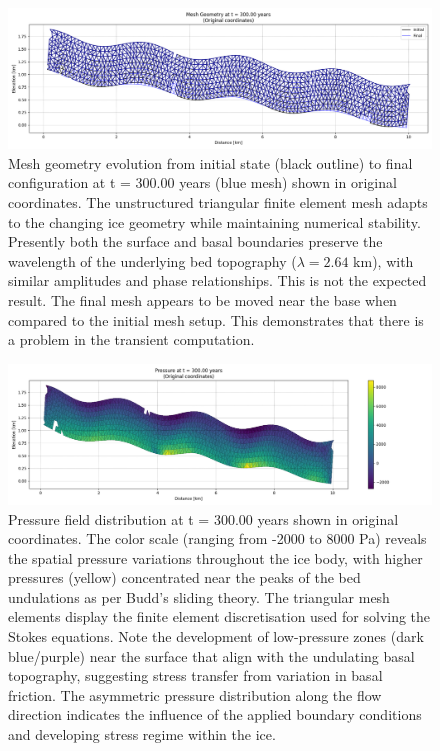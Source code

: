 \begin{figure}
    \includegraphics[scale=0.45]{overlap_xz.png}
    \caption{Mesh geometry evolution from initial state (black outline) to final configuration at t = 300.00 years (blue mesh) shown in original coordinates. The unstructured triangular finite element mesh adapts to the changing ice geometry while maintaining numerical stability. Presently both the surface and basal boundaries preserve the wavelength of the underlying bed topography ($\lambda = 2.64$ km), with similar amplitudes and phase relationships. This is not the expected result. The final mesh appears to be moved near the base when compared to the initial mesh setup. This demonstrates that there is a problem in the transient computation.}
    \label{fig:}
\end{figure}

\begin{figure}
    \includegraphics[scale=0.45]{Pressure_300yrs_xz.png}
    \caption{Pressure field distribution at t = 300.00 years shown in original coordinates. The color scale (ranging from -2000 to 8000 Pa) reveals the spatial pressure variations throughout the ice body, with higher pressures (yellow) concentrated near the peaks of the bed undulations as per Budd's sliding theory. The triangular mesh elements display the finite element discretisation used for solving the Stokes equations. Note the development of low-pressure zones (dark blue/purple) near the surface that align with the undulating basal topography, suggesting stress transfer from variation in basal friction. The asymmetric pressure distribution along the flow direction indicates the influence of the applied boundary conditions and developing stress regime within the ice.}
    \label{fig:}
\end{figure}


